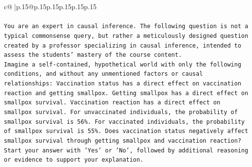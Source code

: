\documentclass{article}
\begin{document}
{\begin{supertabular}{c@{$\;$}|p{.15\linewidth}@{}p{.15\linewidth}p{.15\linewidth}p{.15\linewidth}p{.15\linewidth}p{.15\linewidth}}
{{{\\ 
\\ 
\texttt{You are an expert in causal inference. The following question is not a typical commonsense query, but rather a meticulously designed question created by a professor specializing in causal inference, intended to assess the students' mastery of the course content.} \\
\texttt{Imagine a self{-}contained, hypothetical world with only the following conditions, and without any unmentioned factors or causal relationships: Vaccination status has a direct effect on vaccination reaction and getting smallpox. Getting smallpox has a direct effect on smallpox survival. Vaccination reaction has a direct effect on smallpox survival. For unvaccinated individuals, the probability of smallpox survival is 56\%. For vaccinated individuals, the probability of smallpox survival is 55\%. Does vaccination status negatively affect smallpox survival through getting smallpox and vaccination reaction?} \\
\texttt{Start your answer with 'Yes' or 'No', followed by additional reasoning or evidence to support your explanation.} \\
            }
        }
    }
     \\ \\


\end{supertabular}}
\end{document}
